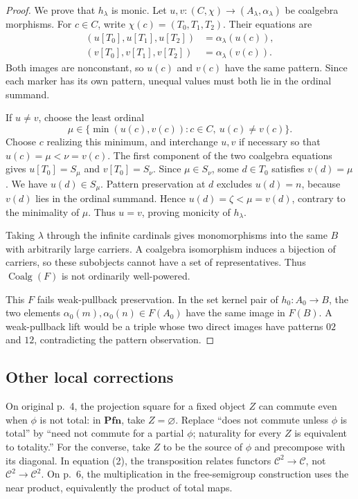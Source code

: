 \documentclass[11pt]{article}
\newcommand{\C}{\mathcal C}\newcommand{\D}{\mathcal D}\newcommand{\B}{\mathcal B}
\begin{document}
\begin{proof}
We prove that $h_\lambda$ is monic. Let
$u,v:(C,\chi)\to(A_\lambda,\alpha_\lambda)$ be coalgebra morphisms.
For $c\in C$, write $\chi(c)=(T_0,T_1,T_2)$. Their equations are
\begin{align*}
(u[T_0],u[T_1],u[T_2])&=\alpha_\lambda(u(c)),\\
(v[T_0],v[T_1],v[T_2])&=\alpha_\lambda(v(c)).
\end{align*}
Both images are nonconstant, so $u(c)$ and $v(c)$ have the same
pattern. Since each marker has its own pattern, unequal values must
both lie in the ordinal summand.

If $u\ne v$, choose the least ordinal
\[
\mu\in\{\min(u(c),v(c)):c\in C,\ u(c)\ne v(c)\}.
\]
Choose $c$ realizing this minimum, and interchange $u,v$ if necessary
so that $u(c)=\mu<\nu=v(c)$. The first component of the two
coalgebra equations gives
$u[T_0]=S_\mu$ and $v[T_0]=S_\nu$.
Since $\mu\in S_\nu$, some $d\in T_0$ satisfies $v(d)=\mu$.
We have $u(d)\in S_\mu$. Pattern preservation at $d$ excludes
$u(d)=n$, because $v(d)$ lies in the ordinal summand. Hence
$u(d)=\zeta<\mu=v(d)$, contrary to the minimality of $\mu$.
Thus $u=v$, proving monicity of $h_\lambda$.

Taking $\lambda$ through the infinite cardinals gives monomorphisms
into the same $B$ with arbitrarily large carriers. A coalgebra
isomorphism induces a bijection of carriers, so these subobjects cannot
have a set of representatives. Thus $\operatorname{Coalg}(F)$ is not
ordinarily well-powered.

This $F$ fails weak-pullback preservation. In the set
kernel pair of $h_0:A_0\to B$, the two elements
$\alpha_0(m),\alpha_0(n)\in F(A_0)$ have the same image in $F(B)$.
A weak-pullback lift would be a triple whose two direct images have
patterns $02$ and $12$, contradicting the pattern observation.
\end{proof}

\subsection{Other local corrections}
On original p.~4, the projection square for a fixed object $Z$ can commute even when $\phi$ is not total: in $\mathbf{Pfn}$, take $Z=\varnothing$. Replace ``does not commute unless $\phi$ is total'' by ``need not commute for a partial $\phi$; naturality for every $Z$ is equivalent to totality.'' For the converse, take $Z$ to be the source of $\phi$ and precompose with its diagonal. In equation (2), the transposition relates functors $\C^2\to\C$, not $\C^2\to\C^2$. On p.~6, the multiplication in the free-semigroup construction uses the near product, equivalently the product of total maps.
\end{document}

